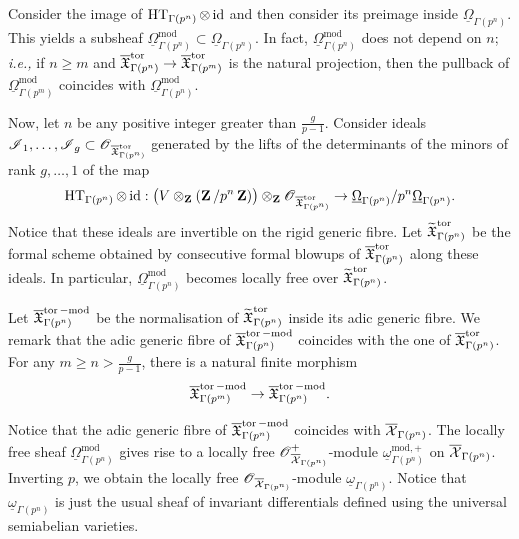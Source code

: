 Consider the image of $\operatorname{HT}_{\Gamma(p^n)}\otimes \operatorname{id}$ and then consider its preimage inside $\underline{\Omega}_{\Gamma(p^n)}$. This yields a subsheaf $\underline{\Omega}_{\Gamma(p^n)}^{\text{mod}}\subset \underline{\Omega}_{\Gamma(p^n)}$. In fact, $\underline{\Omega}_{\Gamma(p^n)}^{\text{mod}}$ does not depend on $n$; \emph{i.e.,} if $n\geq m$ and $\overline{\operatorname{\mathfrak{X}}}_{\Gamma(p^n)}^{\operatorname{tor}} \rightarrow \overline{\operatorname{\mathfrak{X}}}_{\Gamma(p^m)}^{\operatorname{tor}}$ is the natural projection, then the pullback of $\underline{\Omega}_{\Gamma(p^m)}^{\text{mod}}$ coincides with $\underline{\Omega}_{\Gamma(p^n)}^{\text{mod}}$.

Now, let $n$ be any positive integer greater than $\frac{g}{p-1}$. Consider ideals $\operatorname{\mathscr{I}}_1, \ldots, \operatorname{\mathscr{I}}_g\subset \operatorname{\mathscr{O}}_{\overline{\operatorname{\mathfrak{X}}}^{\operatorname{tor}}_{\Gamma(p^n)}}$ generated by the lifts of the determinants of the minors of rank $g,\ldots, 1$ of the map
$$\operatorname{HT}_{\Gamma(p^n)}\otimes \operatorname{id}: \big(V\otimes_{\operatorname{\mathbf{Z}}}(\operatorname{\mathbf{Z}}/p^n\operatorname{\mathbf{Z}})\big)\otimes_{\operatorname{\mathbf{Z}}} \operatorname{\mathscr{O}}_{\overline{\operatorname{\mathfrak{X}}}^{\operatorname{tor}}_{\Gamma(p^n)}}\rightarrow \underline{\Omega}_{\Gamma(p^n)}/p^n\underline{\Omega}_{\Gamma(p^n)}.$$ 
Notice that these ideals are invertible on the rigid generic fibre. Let $\widetilde{\operatorname{\mathfrak{X}}}^{\operatorname{tor}}_{\Gamma(p^n)}$ be the formal scheme obtained by consecutive formal blowups of $\overline{\operatorname{\mathfrak{X}}}^{\operatorname{tor}}_{\Gamma(p^n)}$ along these ideals. In particular, $\underline{\Omega}_{\Gamma(p^n)}^{\text{mod}}$ becomes locally free over $\widetilde{\operatorname{\mathfrak{X}}}^{\operatorname{tor}}_{\Gamma(p^n)}$.  

Let $\overline{\operatorname{\mathfrak{X}}}_{\Gamma(p^n)}^{\operatorname{tor}-\text{mod}}$ be the normalisation of $\widetilde{\operatorname{\mathfrak{X}}}^{\operatorname{tor}}_{\Gamma(p^n)}$ inside its adic generic fibre. We remark that the adic generic fibre of $\overline{\operatorname{\mathfrak{X}}}_{\Gamma(p^n)}^{\operatorname{tor}-\text{mod}}$ coincides with the one of $\overline{\operatorname{\mathfrak{X}}}_{\Gamma(p^n)}^{\operatorname{tor}}$. For any $m\geq n>\frac{g}{p-1}$, there is a natural finite morphism
$$\overline{\operatorname{\mathfrak{X}}}_{\Gamma(p^{m})}^{\operatorname{tor}-\text{mod}}\rightarrow \overline{\operatorname{\mathfrak{X}}}_{\Gamma(p^n)}^{\operatorname{tor}-\text{mod}}.$$

Notice that the adic generic fibre of $\overline{\operatorname{\mathfrak{X}}}_{\Gamma(p^n)}^{\operatorname{tor}-\text{mod}}$ coincides with $\overline{\operatorname{\mathcal{X}}}_{\Gamma(p^n)}$. The locally free sheaf $\underline{\Omega}_{\Gamma(p^n)}^{\text{mod}}$ gives rise to a locally free $\operatorname{\mathscr{O}}^+_{\overline{\operatorname{\mathcal{X}}}_{\Gamma(p^n)}}$-module $\underline{\omega}^{\text{mod},+}_{\Gamma(p^n)}$ on $\overline{\operatorname{\mathcal{X}}}_{\Gamma(p^n)}$. Inverting $p$, we obtain the locally free $\operatorname{\mathscr{O}}_{\overline{\operatorname{\mathcal{X}}}_{\Gamma(p^n)}}$-module $\underline{\omega}_{\Gamma(p^n)}$. Notice that $\underline{\omega}_{\Gamma(p^n)}$ is just the usual sheaf of invariant differentials defined using the universal semiabelian varieties.


